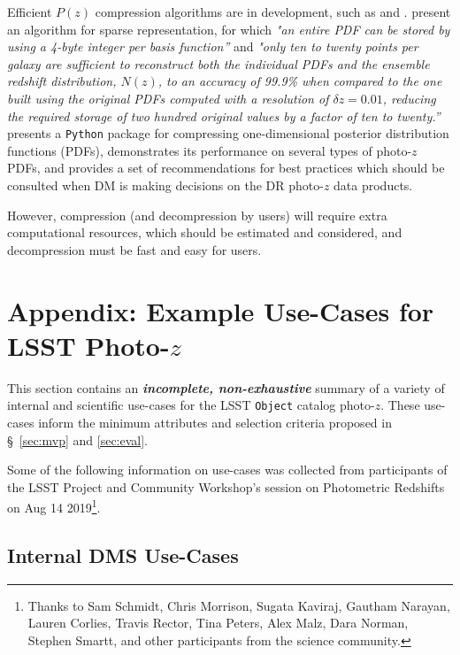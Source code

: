 \documentclass[DM,lsstdraft,toc]{lsstdoc}
\begin{document}
Efficient $P(z)$ compression algorithms are in development, such as \citet{2014MNRAS.441.3550C} and \citet{2018AJ....156...35M}.
\citet{2014MNRAS.441.3550C} present an algorithm for sparse representation, for which {\it "an entire PDF can be stored by using a 4-byte integer per basis function''} and {\it "only ten to twenty points per galaxy are sufficient to reconstruct both the individual PDFs and the ensemble redshift distribution, $N(z)$, to an accuracy of 99.9\% when compared to the one built using the original PDFs computed with a resolution of $\delta z = 0.01$, reducing the required storage of two hundred original values by a factor of ten to twenty.''} 
\citet{2018AJ....156...35M} presents a {\tt Python} package for compressing one-dimensional posterior distribution functions (PDFs), demonstrates its performance on several types of photo-$z$ PDFs, and provides a set of recommendations for best practices which should be consulted when DM is making decisions on the DR photo-$z$ data products.

However, compression (and decompression by users) will require extra computational resources, which should be estimated and considered, and decompression must be fast and easy for users.


\clearpage
\section{Appendix: Example Use-Cases for LSST Photo-$z$} \label{sec:use}

This section contains an \textbf{\textit{incomplete, non-exhaustive}} summary of a variety of internal and scientific use-cases for the LSST {\tt Object} catalog photo-$z$.
These use-cases inform the minimum attributes and selection criteria proposed in \S~\ref{sec:mvp} and \ref{sec:eval}. 

Some of the following information on use-cases was collected from participants of the LSST Project and Community Workshop's session on Photometric Redshifts on Aug 14 2019\footnote{Thanks to Sam Schmidt, Chris Morrison, Sugata Kaviraj, Gautham Narayan, Lauren Corlies, Travis Rector, Tina Peters, Alex Malz, Dara Norman, Stephen Smartt, and other participants from the science community.}.

\subsection{Internal DMS Use-Cases}\label{ssec:use_dm}
\end{document}
